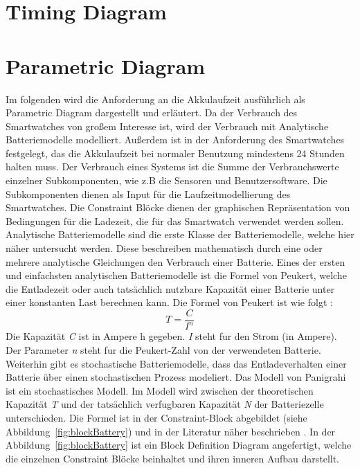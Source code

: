 



\section{Timing Diagram}

\section{Parametric Diagram}
Im folgenden wird die Anforderung an die Akkulaufzeit ausführlich als Parametric Diagram dargestellt und erläutert.
Da der Verbrauch des Smartwatches von großem Interesse ist, wird der Verbrauch
mit Analytische Batteriemodelle modelliert.
Außerdem ist in der Anforderung des Smartwatches festgelegt, das die Akkulaufzeit bei normaler Benutzung mindestens 24 Stunden halten muss. %
Der Verbrauch eines Systems ist die Summe der Verbrauchswerte einzelner Subkomponenten, wie z.B die Sensoren und Benutzersoftware. Die Subkomponenten dienen als Input für die Laufzeitmodellierung des Smartwatches.
Die Constraint Blöcke dienen der graphischen Repräsentation von Bedingungen für die Ladezeit, die für das Smartwatch verwendet werden sollen.
Analytische Batteriemodelle sind die erste Klasse der Batteriemodelle, welche
hier näher untersucht werden.
Diese beschreiben mathematisch durch eine oder mehrere analytische Gleichungen den Verbrauch einer Batterie.
Eines der ersten und einfachsten analytischen Batteriemodelle ist die Formel
von Peukert, welche die Entladezeit oder auch tatsächlich nutzbare Kapazität
einer Batterie unter einer konstanten Last berechnen kann.
Die Formel von Peukert ist wie folgt \cite{peukert}:
\[
T= \frac{C}{I^{n}}
\]
Die Kapazität \textit{C} ist in Ampere h gegeben.
\textit{I} steht fur den Strom (in Ampere). Der Parameter \textit{n} steht fur die
Peukert-Zahl von der verwendeten Batterie.\\
Weiterhin gibt es stochastische Batteriemodelle, dass das Entladeverhalten einer Batterie
über einen stochastischen Prozess modeliert.
Das Modell von Panigrahi ist ein stochastisches Modell.
Im Modell wird zwischen der theoretischen Kapazität \textit{T} und der tatsächlich verfugbaren
Kapazität \textit{N} der Batteriezelle unterschieden.
Die Formel ist in der Constraint-Block abgebildet (siehe Abbildung~\ref{fig:blockBattery}) und in der Literatur näher beschrieben \cite{pan}.
In der Abbildung~\ref{fig:blockBattery} ist ein Block Definition Diagram angefertigt, welche die einzelnen Constraint Blöcke beinhaltet und ihren inneren Aufbau darstellt.

